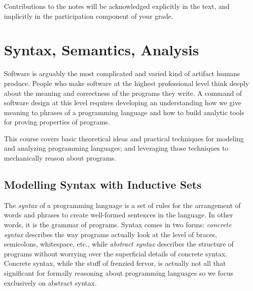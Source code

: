 \documentclass[11pt]{article}
\newcommand{\deftech}[1]{\textbf{#1}}
\begin{document}
Contributions to the notes will be acknowledged explicitly in the
text, and implicitly in the participation component of your grade.






\newpage
\section{Syntax, Semantics, Analysis}

Software is arguably the most complicated and varied kind of artifact
humans produce.
%
People who make software at the highest professional level think
deeply about the meaning and correctness of the programs they write.
%
A command of software design at this level requires developing an
understanding how we give meaning to phrases of a programming language
and how to build analytic tools for proving properties of programs.

This course covers basic theoretical ideas and practical techniques
for modeling and analyzing programming languages; and leveraging those
techniques to mechanically reason about programs.






\subsection{Modelling Syntax with Inductive Sets}

The \emph{syntax} of a programming language is a set of rules for the
arrangement of words and phrases to create well-formed sentences in
the language.  In other words, it is the grammar of programs.  Syntax
comes in two forms: \emph{concrete syntax} describes the way programs
actually look at the level of braces, semicolons, whitespace, etc.,
while \emph{abstract syntax} describes the structure of programs
without worrying over the superficial details of concrete syntax.
Concrete syntax, while the stuff of frenzied fervor, is actually not
all that significant for formally reasoning about programming
languages so we focus exclusively on abstract syntax.
\end{document}
